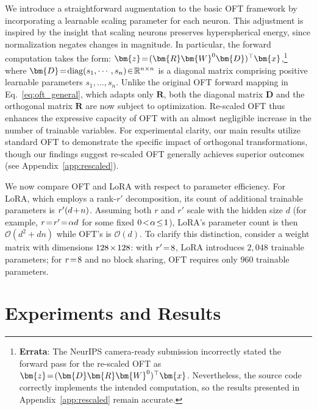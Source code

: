 \begin{itemize}[leftmargin=*,nosep]

We introduce a straightforward augmentation to the basic OFT framework by incorporating a learnable scaling parameter for each neuron. This adjustment is inspired by the insight that scaling neurons preserves hyperspherical energy, since normalization negates changes in magnitude. In particular, the forward computation takes the form: $\thickmuskip=2mu \medmuskip=2mu\bm{z}=(\bm{R}\bm{W}^0\bm{D})^\top\bm{x}$,\footnote{\textbf{Errata}: The NeurIPS camera-ready submission incorrectly stated the forward pass for the re-scaled OFT as $\thickmuskip=2mu \medmuskip=2mu\bm{z}=(\bm{D}\bm{R}\bm{W}^0)^\top\bm{x}$. Nevertheless, the source code correctly implements the intended computation, so the results presented in Appendix~\ref{app:rescaled} remain accurate.} where $\thickmuskip=2mu \medmuskip=2mu \bm{D}=\text{diag}(s_1,\cdots,s_n)\in\mathbb{R}^{n\times n}$ is a diagonal matrix comprising positive learnable parameters $s_1,\ldots,s_n$. Unlike the original OFT forward mapping in Eq.~\eqref{eq:oft_general}, which adapts only $\bm{R}$, both the diagonal matrix $\bm{D}$ and the orthogonal matrix $\bm{R}$ are now subject to optimization. Re-scaled OFT thus enhances the expressive capacity of OFT with an almost negligible increase in the number of trainable variables. For experimental clarity, our main results utilize standard OFT to demonstrate the specific impact of orthogonal transformations, though our findings suggest re-scaled OFT generally achieves superior outcomes (see Appendix~\ref{app:rescaled}).

We now compare OFT and LoRA with respect to parameter efficiency. For LoRA, which employs a rank-$r'$ decomposition, its count of additional trainable parameters is $\thickmuskip=2mu \medmuskip=2mu r'(d+n)$. Assuming both $r$ and $r'$ scale with the hidden size $d$ (for example, $\thickmuskip=2mu \medmuskip=2mu r=r'=\alpha d$ for some fixed $\thickmuskip=2mu \medmuskip=2mu 0<\alpha\leq 1$), LoRA's parameter count is then $\mathcal{O}(d^2+dn)$ while OFT's is $\mathcal{O}(d)$. To clarify this distinction, consider a weight matrix with dimensions $\thickmuskip=2mu \medmuskip=2mu 128\times 128$: with $\thickmuskip=2mu \medmuskip=2mu r'=8$, LoRA introduces $2,048$ trainable parameters; for $\thickmuskip=2mu \medmuskip=2mu r=8$ and no block sharing, OFT requires only $960$ trainable parameters.

\section{Experiments and Results}


\end{itemize}
